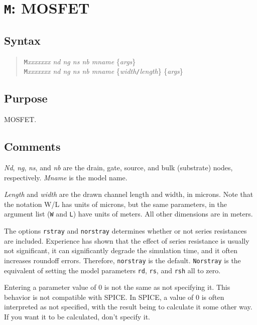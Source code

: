 \section{{\tt M}: MOSFET}
\subsection{Syntax}
\begin{verse}
{\tt M}{\it xxxxxxx nd ng ns nb mname} \{{\it args}\}\\
{\tt M}{\it xxxxxxx nd ng ns nb mname}
	\{{\it width}{\tt /}{\it length}\} \{{\it args}\}
\end{verse}
\subsection{Purpose}

MOSFET.
\subsection{Comments}

{\it Nd}, {\it ng}, {\it ns}, and {\it nb} are the drain, gate, source, and
bulk (substrate) nodes, respectively.  {\it Mname} is the model name.

{\it Length} and {\it width} are the drawn channel length and width, in
microns.  Note that the notation W/L has units of microns, but the same
parameters, in the argument list ({\tt W} and {\tt L}) have units of meters.
All other dimensions are in meters.

The options {\tt rstray} and {\tt norstray} determines whether or not series 
resistances are included.  Experience has shown that the effect of series 
resistance is usually not significant, it can significantly degrade the 
simulation time, and it often increases roundoff errors.  Therefore, 
{\tt norstray} is the default.  {\tt Norstray} is the equivalent of 
setting the model parameters {\tt rd}, {\tt rs}, and {\tt rsh} all to zero.

Entering a parameter value of 0 is not the same as not specifying
it.  This behavior is not compatible with SPICE.  In SPICE, a value
of 0 is often interpreted as not specified, with the result being
to calculate it some other way.  If you want it to be calculated,
don't specify it.

